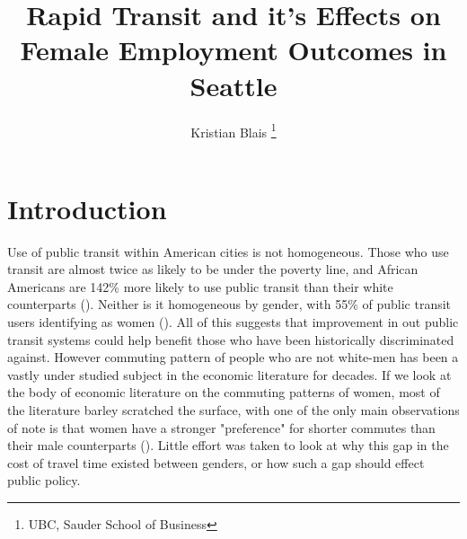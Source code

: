 \documentclass[A4paper,12pt]{article}
\title{\textbf{Rapid Transit and it's Effects on Female Employment Outcomes in Seattle}}
\author{Kristian Blais \footnote{UBC, Sauder School of Business}\\}
\date{\vspace{-8mm}}
\begin{document}
\doublespacing

\maketitle

\begin{abstract}
\end{abstract}

\newpage

\tableofcontents

\newpage

\section{Introduction}
 

Use of public transit within American cities is not homogeneous. Those who use transit are almost twice as likely to be under the poverty line, and African Americans are 142\% more likely to use public transit than their white counterparts (\cite{clark_hugh_m_who_2017}). Neither is it homogeneous by gender, with 55\% of public transit users identifying as women (\cite{anderson_who_2016}). All of this suggests that improvement in out public transit systems could help benefit those who have been historically discriminated against. However commuting pattern of people who are not white-men has been a vastly under studied subject in the economic literature for decades. If we look at the body of economic literature on the commuting patterns of women, most of the literature barley scratched the surface, with one of the only main observations of note is that women have a stronger "preference" for shorter commutes than their male counterparts (\cite{blumen_gender_1994}). Little effort was taken to look at why this gap in the cost of travel time existed between genders, or how such a gap should effect public policy.\\
\end{document}
